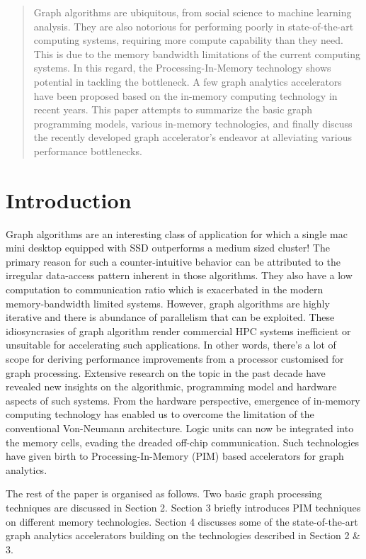 \begin{abstract}
 
  Graph algorithms are ubiquitous, from social science to machine learning analysis. They are also notorious for performing poorly in state-of-the-art computing systems, requiring more compute capability than they need. This is due to the memory bandwidth limitations of the current computing systems. In this regard, the Processing-In-Memory technology shows potential in tackling the bottleneck. A few graph analytics accelerators have been proposed based on the in-memory computing technology in recent years. This paper attempts to summarize the basic graph programming models, various in-memory technologies, and finally discuss the recently developed graph accelerator's endeavor at alleviating various performance bottlenecks.
  
\end{abstract}


\section{Introduction}
Graph algorithms are an interesting class of application for which a single mac mini desktop equipped with SSD outperforms a medium sized cluster! \cite{GraphChi} The primary reason for such a counter-intuitive behavior can be attributed to the irregular data-access pattern inherent in those algorithms. They also have a low computation to communication ratio which is exacerbated in the modern memory-bandwidth limited systems. However, graph algorithms are highly iterative and there is abundance of parallelism that can be exploited. These idiosyncrasies of graph algorithm render commercial HPC systems inefficient or unsuitable for accelerating such applications. In other words, there's a lot of scope for deriving performance improvements from a processor customised for graph processing. Extensive research on the topic in the past decade have revealed new insights on the algorithmic, programming model and hardware aspects of such systems. From the hardware perspective, emergence of in-memory computing technology has enabled us to overcome the limitation of the conventional Von-Neumann architecture. Logic units can now be integrated into the memory cells, evading the dreaded off-chip communication. Such technologies have given birth to Processing-In-Memory (PIM) based accelerators for graph analytics. 

The rest of the paper is organised as follows. Two basic graph processing techniques are discussed in Section 2. Section 3 briefly introduces PIM techniques on different memory technologies. Section 4 discusses some of the state-of-the-art graph analytics accelerators building on the technologies described in Section 2 \& 3.
